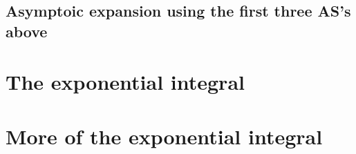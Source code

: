 \documentclass[11pt,letter, swedish, english
]{article}
\begin{document}
\subsection{Asymptoic expansion using the first three AS's above}




\section{The exponential integral}


\section{More of the exponential integral}
\end{document}
